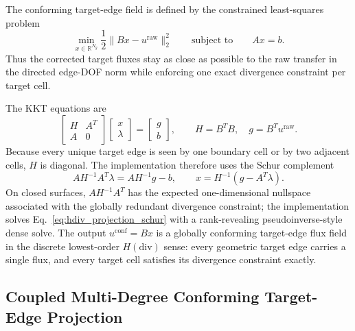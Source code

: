 \documentclass[11pt]{article}
\begin{document}
The conforming target-edge field is defined by the constrained least-squares
problem
\begin{equation}
  \min_{x\in\mathbb{R}^{N_g}} \frac{1}{2}\|Bx-u^{\mathrm{raw}}\|_2^2
  \qquad\text{subject to}\qquad
  Ax=b .
  \label{eq:hdiv_projection_problem}
\end{equation}
Thus the corrected target fluxes stay as close as possible to the raw transfer
in the directed edge-DOF norm while enforcing one exact divergence constraint
per target cell.

The KKT equations are
\begin{equation}
  \begin{bmatrix}
    H & A^T \\
    A & 0
  \end{bmatrix}
  \begin{bmatrix}
    x \\
    \lambda
  \end{bmatrix}
  =
  \begin{bmatrix}
    g \\
    b
  \end{bmatrix},
  \qquad
  H=B^T B,\quad g=B^T u^{\mathrm{raw}} .
  \label{eq:hdiv_projection_kkt}
\end{equation}
Because every unique target edge is seen by one boundary cell or by two
adjacent cells, \(H\) is diagonal.  The implementation therefore uses the Schur
complement
\begin{equation}
  A H^{-1} A^T \lambda = A H^{-1} g - b,
  \qquad
  x = H^{-1}(g - A^T \lambda).
  \label{eq:hdiv_projection_schur}
\end{equation}
On closed surfaces, \(AH^{-1}A^T\) has the expected one-dimensional nullspace
associated with the globally redundant divergence constraint; the implementation
solves Eq.~\eqref{eq:hdiv_projection_schur} with a rank-revealing
pseudoinverse-style dense solve.  The output \(u^{\mathrm{conf}}=Bx\) is a
globally conforming target-edge flux field in the discrete lowest-order
\(H(\mathrm{div})\) sense: every geometric target edge carries a single flux,
and every target cell satisfies its divergence constraint exactly.

\subsection{Coupled Multi-Degree Conforming Target-Edge Projection}
\label{sec:coupled-conforming}
\end{document}
